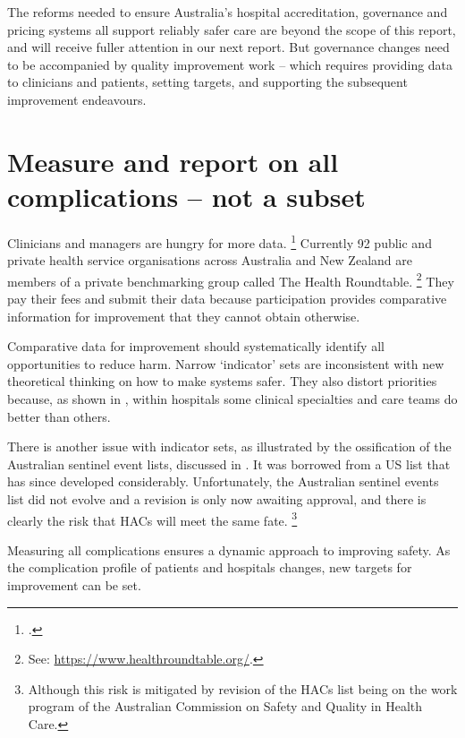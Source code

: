 \documentclass[FrontPage]{grattan}
\begin{document}
The reforms needed to ensure Australia's hospital accreditation, governance and pricing systems all support reliably safer care are beyond the scope of this report, and will receive fuller attention in our next report.
But governance changes need to be accompanied by quality improvement work -- which requires providing data to clinicians and patients, setting targets, and supporting the subsequent improvement endeavours.

\section{Measure and report on all complications -- not a subset}\label{sec:measure-and-report-on-all-complications-not-a-subset}

Clinicians and managers are hungry for more data.%
	\footcites{Jorm-2017-Clinical-engagement}{Duckett-Review-2016-Quality-assurance-in-Vic}
Currently 92 public and private health service organisations across Australia and New Zealand are members of a private benchmarking group called The Health Roundtable.%
	\footnote{See: \textcolor{blue}{\url{https://www.healthroundtable.org/}}.}
They pay their fees and submit their data because participation provides comparative information for improvement that they cannot obtain otherwise.

Comparative data for improvement should systematically identify all opportunities to reduce harm.
Narrow `indicator' sets are inconsistent with new theoretical thinking on how to make systems safer.
They also distort priorities because, as shown in , within hospitals some clinical specialties and care teams do better than others.

There is another issue with indicator sets, as illustrated by the ossification of the Australian sentinel event lists, discussed in .
It was borrowed from a US list that has since developed considerably.
Unfortunately, the Australian sentinel events list did not evolve and a revision is only now awaiting approval, and there is clearly the risk that HACs will meet the same fate.%
	\footnote{Although this risk is mitigated by revision of the HACs list being on the work program of the Australian Commission on Safety and Quality in Health Care.}

Measuring all complications ensures a dynamic approach to improving safety.
As the complication profile of patients and hospitals changes, new targets for improvement can be set.
\end{document}
